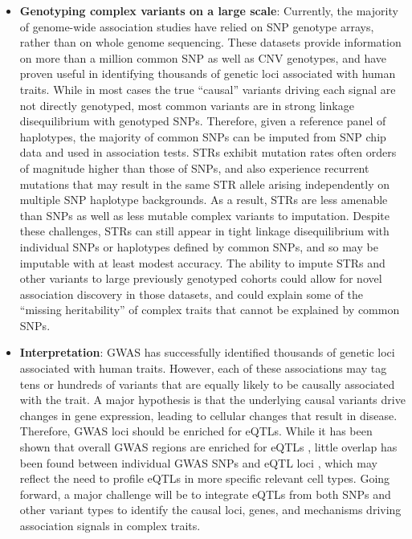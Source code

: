 \begin{itemize}
\item \textbf{Genotyping complex variants on a large scale}: Currently, the majority of genome-wide association studies have relied on SNP genotype arrays, rather than on whole genome sequencing. These datasets provide information on more than a million common SNP as well as CNV genotypes, and have proven useful in identifying thousands of genetic loci associated with human traits. While in most cases the true ``causal'' variants driving each signal are not directly genotyped, most common variants are in strong linkage disequilibrium with genotyped SNPs. Therefore, given a reference panel of haplotypes, the majority of common SNPs can be imputed from SNP chip data and used in association tests. STRs exhibit mutation rates often orders of magnitude higher than those of SNPs, and also experience recurrent mutations that may result in the same STR allele arising independently on multiple SNP haplotype backgrounds. As a result, STRs are less amenable than SNPs as well as less mutable complex variants to imputation. Despite these challenges, STRs can still appear in tight linkage disequilibrium with individual SNPs or haplotypes defined by common SNPs, and so may be imputable with at least modest accuracy. The ability to impute STRs and other variants to large previously genotyped cohorts could allow for novel association discovery in those datasets, and could explain some of the ``missing heritability'' of complex traits that cannot be explained by common SNPs. 

\item \textbf{Interpretation}: GWAS has successfully identified thousands of genetic loci associated with human traits. However, each of these associations may tag tens or hundreds of variants that are equally likely to be causally associated with the trait. A major hypothesis is that the underlying causal variants drive changes in gene expression, leading to cellular changes that result in disease. Therefore, GWAS loci should be enriched for eQTLs. While it has been shown that overall GWAS regions are enriched for eQTLs \cite{NicolaeGamazonZhangEtAl2010}, little overlap has been found between individual GWAS SNPs and eQTL loci \cite{HuangFangJostinsEtAl2015}, which may reflect the need to profile eQTLs in more specific relevant cell types. Going forward, a major challenge will be to integrate eQTLs from both SNPs and other variant types to identify the causal loci, genes, and mechanisms driving association signals in complex traits.

\end{itemize}


